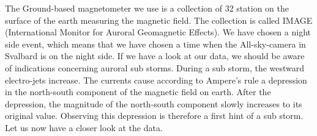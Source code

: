 \documentclass[10pt,a4paper]{article}
\begin{document}
The Ground-based magnetometer we use is a collection of 32 station on the surface of the earth measuring the magnetic field. The collection is called 
IMAGE (International Monitor for Auroral Geomagnetic Effects). We have chosen a night side event, which means that we have chosen a time when the All-sky-camera 
in Svalbard is on the night side. If we have a look at our data, we should be aware of indications concerning auroral sub storms. During a sub storm, 
the westward electro-jets increase. The currents cause according to Ampere's rule a depression in the north-south component of the magnetic field on earth. 
After the depression, the magnitude of the north-south component slowly increases to its original value.
Observing this depression is therefore a first hint of a sub storm. Let us now have a closer look at the data. 
\end{document}
